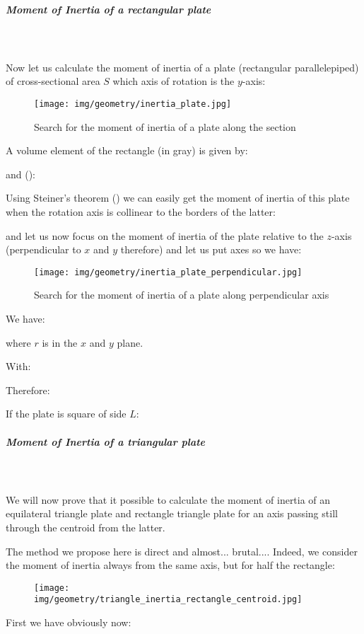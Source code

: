 {	\subparagraph{Moment of Inertia of a rectangular plate}\label{moment of inertia of a rectangular plate}\mbox{}\\\\
	Now let us calculate the moment of inertia of a plate (rectangular parallelepiped) of cross-sectional area $S$ which axis of rotation is the $y$-axis:
	\begin{figure}[H]
		\centering
		\texttt{[image: img/geometry/inertia\_plate.jpg]}
		\caption[]{Search for the moment of inertia of a plate along the section}
	\end{figure}
	A volume element of the rectangle (in gray) is given by:
	
	and ():
	
	Using Steiner's theorem ()  we can easily get the moment of inertia of this plate when the rotation axis is collinear to the borders of the latter:
	
	and let us now focus on the moment of inertia of the plate relative to the $z$-axis (perpendicular to $x$ and $y$ therefore) and let us put axes so we have:
	\begin{figure}[H]
		\centering
		\texttt{[image: img/geometry/inertia\_plate\_perpendicular.jpg]}
		\caption[]{Search for the moment of inertia of a plate along perpendicular axis}
	\end{figure}
	We have:
	
	where $r$ is in the $x$ and $y$ plane.
	
	With:
	
	Therefore:
	
	If the plate is square of side $L$:
	
	
	\pagebreak
	\subparagraph{Moment of Inertia of a triangular plate}\mbox{}\\\\
	We will now prove that it possible to calculate the moment of inertia of an equilateral triangle plate and rectangle triangle plate for an axis passing still through the centroid from the latter.
	
	The method we propose here is direct and almost... brutal.... Indeed, we consider the moment of inertia always from the same axis, but for half the rectangle:
	\begin{figure}[H]
		\centering
		\texttt{[image: img/geometry/triangle\_inertia\_rectangle\_centroid.jpg]}
	\end{figure}	
	 First we have obviously now:
	
}
